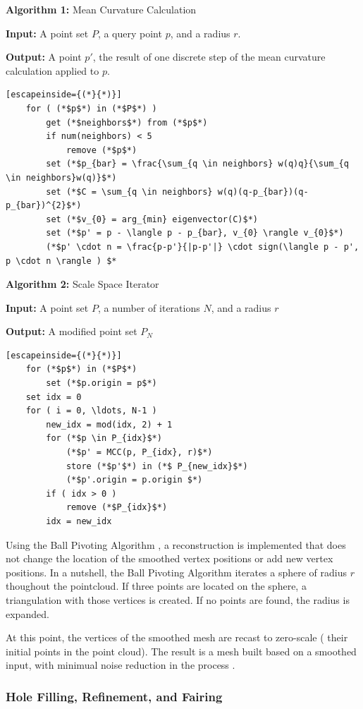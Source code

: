 \documentclass[12pt]{drexelthesis}
\let\Oldsubsubsection\subsubsection
\renewcommand{\subsubsection}{\FloatBarrier\Oldsubsubsection}
\begin{document}
\textbf{Algorithm 1:} Mean Curvature Calculation

  \textbf{Input:} A point set $P$, a query point $p$, and a radius $r$.
	
  \textbf{Output:} A point $p'$, the result of one discrete step of the mean curvature calculation applied to $p$.
\begin{lstlisting}[escapeinside={(*}{*)}]
	for ( (*$p$*) in (*$P$*) )
		get (*$neighbors$*) from (*$p$*)
		if num(neighbors) < 5
			remove (*$p$*)
		set (*$p_{bar} = \frac{\sum_{q \in neighbors} w(q)q}{\sum_{q \in neighbors}w(q)}$*)
		set (*$C = \sum_{q \in neighbors} w(q)(q-p_{bar})(q-p_{bar})^{2}$*)
		set (*$v_{0} = arg_{min} eigenvector(C)$*)
		set (*$p' = p - \langle p - p_{bar}, v_{0} \rangle v_{0}$*)
		(*$p' \cdot n = \frac{p-p'}{|p-p'|} \cdot sign(\langle p - p', p \cdot n \rangle ) $*	
\end{lstlisting}

\textbf{Algorithm 2:} Scale Space Iterator

  \textbf{Input:} A point set $P$, a number of iterations $N$, and a radius $r$
	
  \textbf{Output:} A modified point set $P_{N}$


\begin{lstlisting}[escapeinside={(*}{*)}]
	for (*$p$*) in (*$P$*)
		set (*$p.origin = p$*)
	set idx = 0
	for ( i = 0, \ldots, N-1 )
		new_idx = mod(idx, 2) + 1
		for (*$p \in P_{idx}$*)
			(*$p' = MCC(p, P_{idx}, r)$*)
			store (*$p'$*) in (*$ P_{new_idx}$*)
			(*$p'.origin = p.origin $*)
		if ( idx > 0 )
			remove (*$P_{idx}$*)
		idx = new_idx
\end{lstlisting}

Using the Ball Pivoting Algorithm \cite{ballpivot}, a reconstruction is implemented that does not change the location of the smoothed vertex positions or add new vertex positions. In a nutshell, the Ball Pivoting Algorithm iterates a sphere of radius $r$ thoughout the pointcloud. If three points are located on the sphere, a triangulation with those vertices is created. If no points are found, the radius is expanded.

At this point, the vertices of the smoothed mesh are recast to zero-scale ( their initial points in the point cloud). The result is a mesh built based on a smoothed input, with minimual noise reduction in the process \cite{RN67}.

\subsubsection{Hole Filling, Refinement, and Fairing}
\end{document}
